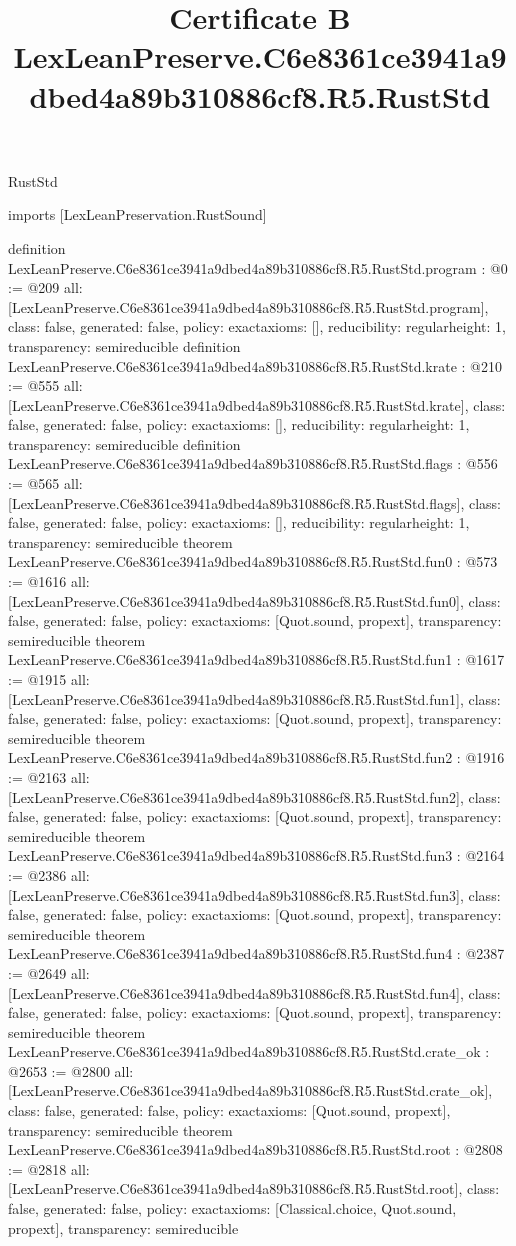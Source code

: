 \begin{lexlean}{RustStd}
\title{Certificate B LexLeanPreserve.C6e8361ce3941a9dbed4a89b310886cf8.R5.RustStd}
\begin{coremodule}
imports [LexLeanPreservation.RustSound]

definition LexLeanPreserve.C6e8361ce3941a9dbed4a89b310886cf8.R5.RustStd.program : @0 := @209 {
  all: [LexLeanPreserve.C6e8361ce3941a9dbed4a89b310886cf8.R5.RustStd.program],
  class: false,
  generated: false,
  policy: exact{axioms: []},
  reducibility: regular{height: 1},
  transparency: semireducible
}
definition LexLeanPreserve.C6e8361ce3941a9dbed4a89b310886cf8.R5.RustStd.krate : @210 := @555 {
  all: [LexLeanPreserve.C6e8361ce3941a9dbed4a89b310886cf8.R5.RustStd.krate],
  class: false,
  generated: false,
  policy: exact{axioms: []},
  reducibility: regular{height: 1},
  transparency: semireducible
}
definition LexLeanPreserve.C6e8361ce3941a9dbed4a89b310886cf8.R5.RustStd.flags : @556 := @565 {
  all: [LexLeanPreserve.C6e8361ce3941a9dbed4a89b310886cf8.R5.RustStd.flags],
  class: false,
  generated: false,
  policy: exact{axioms: []},
  reducibility: regular{height: 1},
  transparency: semireducible
}
theorem LexLeanPreserve.C6e8361ce3941a9dbed4a89b310886cf8.R5.RustStd.fun0 : @573 := @1616 {
  all: [LexLeanPreserve.C6e8361ce3941a9dbed4a89b310886cf8.R5.RustStd.fun0],
  class: false,
  generated: false,
  policy: exact{axioms: [Quot.sound, propext]},
  transparency: semireducible
}
theorem LexLeanPreserve.C6e8361ce3941a9dbed4a89b310886cf8.R5.RustStd.fun1 : @1617 := @1915 {
  all: [LexLeanPreserve.C6e8361ce3941a9dbed4a89b310886cf8.R5.RustStd.fun1],
  class: false,
  generated: false,
  policy: exact{axioms: [Quot.sound, propext]},
  transparency: semireducible
}
theorem LexLeanPreserve.C6e8361ce3941a9dbed4a89b310886cf8.R5.RustStd.fun2 : @1916 := @2163 {
  all: [LexLeanPreserve.C6e8361ce3941a9dbed4a89b310886cf8.R5.RustStd.fun2],
  class: false,
  generated: false,
  policy: exact{axioms: [Quot.sound, propext]},
  transparency: semireducible
}
theorem LexLeanPreserve.C6e8361ce3941a9dbed4a89b310886cf8.R5.RustStd.fun3 : @2164 := @2386 {
  all: [LexLeanPreserve.C6e8361ce3941a9dbed4a89b310886cf8.R5.RustStd.fun3],
  class: false,
  generated: false,
  policy: exact{axioms: [Quot.sound, propext]},
  transparency: semireducible
}
theorem LexLeanPreserve.C6e8361ce3941a9dbed4a89b310886cf8.R5.RustStd.fun4 : @2387 := @2649 {
  all: [LexLeanPreserve.C6e8361ce3941a9dbed4a89b310886cf8.R5.RustStd.fun4],
  class: false,
  generated: false,
  policy: exact{axioms: [Quot.sound, propext]},
  transparency: semireducible
}
theorem LexLeanPreserve.C6e8361ce3941a9dbed4a89b310886cf8.R5.RustStd.crate_ok : @2653 := @2800 {
  all: [LexLeanPreserve.C6e8361ce3941a9dbed4a89b310886cf8.R5.RustStd.crate_ok],
  class: false,
  generated: false,
  policy: exact{axioms: [Quot.sound, propext]},
  transparency: semireducible
}
theorem LexLeanPreserve.C6e8361ce3941a9dbed4a89b310886cf8.R5.RustStd.root : @2808 := @2818 {
  all: [LexLeanPreserve.C6e8361ce3941a9dbed4a89b310886cf8.R5.RustStd.root],
  class: false,
  generated: false,
  policy: exact{axioms: [Classical.choice, Quot.sound, propext]},
  transparency: semireducible
}


\end{coremodule}
\end{lexlean}
